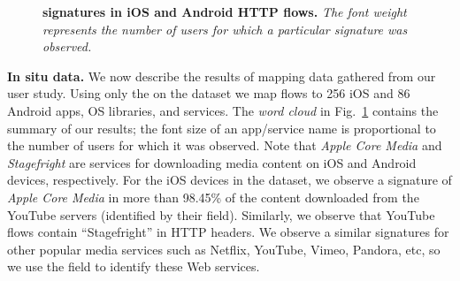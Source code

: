 \begin{figure}
\newline
{}
\caption{\textbf{\useragent signatures in  iOS and Android HTTP flows.} \emph{The font weight represents the number of users for which a particular signature was observed.}}
\vspace{\postfigspace}
\label{fig:http-wordcloud}
\end{figure}

\textbf{In situ data.}
We now describe the results of mapping data gathered from our user study.
Using only the \useragent on the \mobWild dataset we map flows to 256 iOS and 86 Android apps, OS libraries, and services. 
The \emph{word cloud} in Fig.~\ref{fig:http-wordcloud} contains the summary of our results; the font size of an app/service name is proportional to the number of users for which it was observed.
Note that \emph{Apple Core Media} and \emph{Stagefright} are services for downloading media content on iOS and Android devices, respectively.
For the iOS devices in the \mobWild dataset, we observe a signature of \emph{Apple Core Media} in more than 98.45\% of the content downloaded from the YouTube servers (identified by their \httphost field).
Similarly, we observe that YouTube flows contain ``Stagefright'' in HTTP headers. %
We observe a similar signatures for other popular media services such as Netflix, YouTube, Vimeo, Pandora, etc, so we use the \httphost field to identify these Web services.


